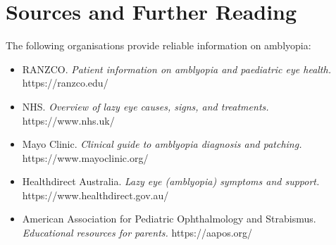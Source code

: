 \section*{Sources and Further Reading}
The following organisations provide reliable information on amblyopia:

\begin{itemize}
    \item RANZCO. \textit{Patient information on amblyopia and paediatric eye health.} https://ranzco.edu/
    \item NHS. \textit{Overview of lazy eye causes, signs, and treatments.} https://www.nhs.uk/
    \item Mayo Clinic. \textit{Clinical guide to amblyopia diagnosis and patching.} https://www.mayoclinic.org/
    \item Healthdirect Australia. \textit{Lazy eye (amblyopia) symptoms and support.} https://www.healthdirect.gov.au/
    \item American Association for Pediatric Ophthalmology and Strabismus. \textit{Educational resources for parents.} https://aapos.org/
\end{itemize}
